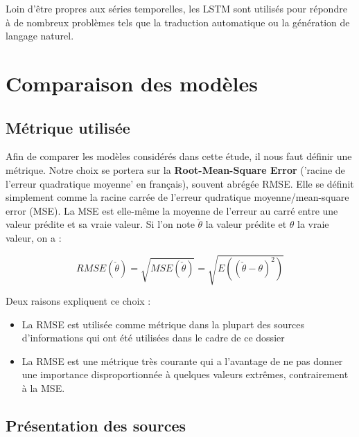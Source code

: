 \documentclass[french]{article}
\begin{document}
    Loin d'être propres aux séries temporelles, les LSTM sont utilisés pour répondre à de nombreux problèmes tels que la traduction automatique ou la génération de langage naturel.

    \section{Comparaison des modèles}

    \subsection{Métrique utilisée}
    
    Afin de comparer les modèles considérés dans cette étude, il nous faut définir une métrique. Notre choix se portera sur la \textbf{Root-Mean-Square Error} ('racine de l'erreur quadratique moyenne' en français), souvent abrégée RMSE. Elle se définit simplement comme la racine carrée de l'erreur qudratique moyenne/mean-square error (MSE). La MSE est elle-même la moyenne de l'erreur au carré entre une valeur prédite et sa vraie valeur. Si l'on note $\check{\theta}$ la valeur prédite et $\theta$ la vraie valeur, on a :
    
    \begin{equation}RMSE(\check{\theta}) =  \sqrt{MSE(\check{\theta})} = \sqrt{E((\check{\theta} - \theta)^2)}\end{equation}

    Deux raisons expliquent ce choix :
    \begin{itemize}
        \item La RMSE est utilisée comme métrique dans la plupart des sources d'informations qui ont été utilisées dans le cadre de ce dossier
        \item La RMSE est une métrique très courante qui a l'avantage de ne pas donner une importance disproportionnée à quelques valeurs extrêmes, contrairement à la MSE.
    \end{itemize}

    \subsection{Présentation des sources}
\end{document}
